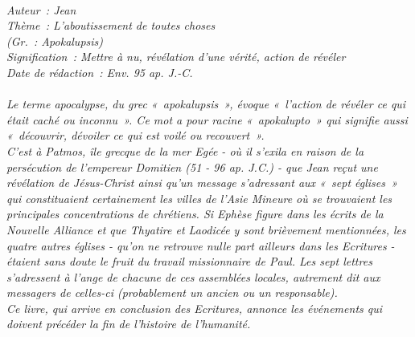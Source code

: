 \BFont
\noindent\hrulefill
{\footnotesize
\textit{
\bigskip
{\centering{}
\\Auteur~: Jean
\\Thème~: L'aboutissement de toutes choses
\\(Gr.~: Apokalupsis)
\\Signification~: Mettre à nu, révélation d'une vérité, action de révéler
\\Date de rédaction~: Env. 95 ap. J.-C.\\}
}
\textit{
\\Le terme apocalypse, du grec «~apokalupsis~», évoque «~l'action de révéler ce qui était caché ou inconnu~». Ce mot a pour racine «~apokalupto~» qui signifie aussi «~découvrir, dévoiler ce qui est voilé ou recouvert~».
\\C'est à Patmos, île grecque de la mer Egée - où il s'exila en raison de la persécution de l'empereur Domitien (51 - 96 ap. J.C.) - que Jean reçut une révélation de Jésus-Christ ainsi qu'un message s'adressant aux «~sept églises~» qui constituaient certainement les villes de l'Asie Mineure où se trouvaient les principales concentrations de chrétiens. Si Ephèse figure dans les écrits de la Nouvelle Alliance et que Thyatire et Laodicée y sont brièvement mentionnées, les quatre autres églises - qu'on ne retrouve nulle part ailleurs dans les Ecritures - étaient sans doute le fruit du travail missionnaire de Paul. Les sept lettres s'adressent à l'ange de chacune de ces assemblées locales, autrement dit aux messagers de celles-ci (probablement un ancien ou un responsable).
\\Ce livre, qui arrive en conclusion des Ecritures, annonce les événements qui doivent précéder la fin de l'histoire de l'humanité.\bigskip
}
}
\par\nobreak\noindent\hrulefill
